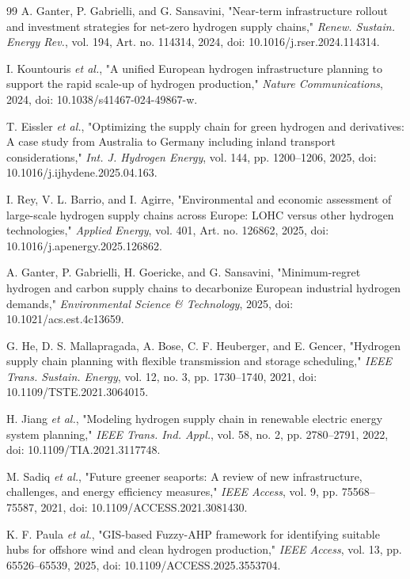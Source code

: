 \documentclass{ieeeaccess}
\begin{document}
\begin{thebibliography}{99}
A. Ganter, P. Gabrielli, and G. Sansavini, "Near-term infrastructure rollout and investment strategies for net-zero hydrogen supply chains," \emph{Renew. Sustain. Energy Rev.}, vol. 194, Art. no. 114314, 2024, doi: 10.1016/j.rser.2024.114314.

I. Kountouris \emph{et al.}, "A unified European hydrogen infrastructure planning to support the rapid scale-up of hydrogen production," \emph{Nature Communications}, 2024, doi: 10.1038/s41467-024-49867-w.

T. Eissler \emph{et al.}, "Optimizing the supply chain for green hydrogen and derivatives: A case study from Australia to Germany including inland transport considerations," \emph{Int. J. Hydrogen Energy}, vol. 144, pp. 1200--1206, 2025, doi: 10.1016/j.ijhydene.2025.04.163.

I. Rey, V. L. Barrio, and I. Agirre, "Environmental and economic assessment of large-scale hydrogen supply chains across Europe: LOHC versus other hydrogen technologies," \emph{Applied Energy}, vol. 401, Art. no. 126862, 2025, doi: 10.1016/j.apenergy.2025.126862.

A. Ganter, P. Gabrielli, H. Goericke, and G. Sansavini, "Minimum-regret hydrogen and carbon supply chains to decarbonize European industrial hydrogen demands," \emph{Environmental Science \& Technology}, 2025, doi: 10.1021/acs.est.4c13659.

G. He, D. S. Mallapragada, A. Bose, C. F. Heuberger, and E. Gencer, "Hydrogen supply chain planning with flexible transmission and storage scheduling," \emph{IEEE Trans. Sustain. Energy}, vol. 12, no. 3, pp. 1730--1740, 2021, doi: 10.1109/TSTE.2021.3064015.

H. Jiang \emph{et al.}, "Modeling hydrogen supply chain in renewable electric energy system planning," \emph{IEEE Trans. Ind. Appl.}, vol. 58, no. 2, pp. 2780--2791, 2022, doi: 10.1109/TIA.2021.3117748.

M. Sadiq \emph{et al.}, "Future greener seaports: A review of new infrastructure, challenges, and energy efficiency measures," \emph{IEEE Access}, vol. 9, pp. 75568--75587, 2021, doi: 10.1109/ACCESS.2021.3081430.

K. F. Paula \emph{et al.}, "GIS-based Fuzzy-AHP framework for identifying suitable hubs for offshore wind and clean hydrogen production," \emph{IEEE Access}, vol. 13, pp. 65526--65539, 2025, doi: 10.1109/ACCESS.2025.3553704.


\end{thebibliography}
\end{document}
